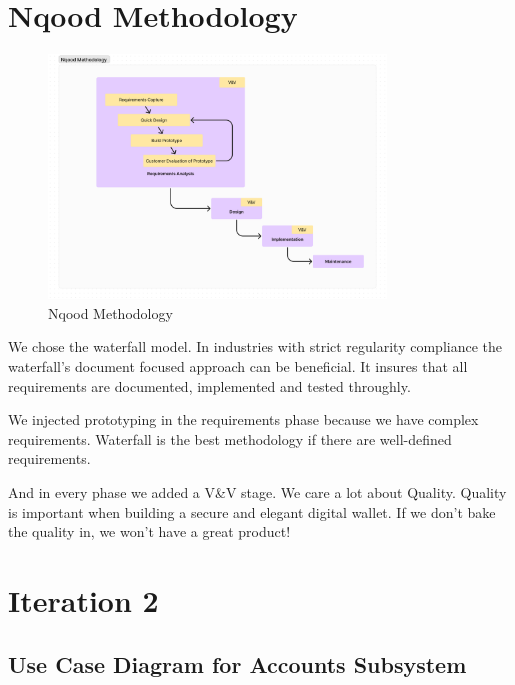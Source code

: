 \documentclass[a4paper]{report}
\begin{document}
\chapter{Nqood Methodology}

\begin{figure}[h!]
    \centering
    \includegraphics[width=0.8\textwidth]{images/nqood-methodology.png}
    \caption{Nqood Methodology}
    \label{fig:nqood-methodology}
\end{figure}

We chose the waterfall model. In industries with strict regularity compliance the waterfall's
document focused approach can be beneficial. It insures that all requirements are documented, implemented and tested
throughly. 

We injected prototyping in the requirements phase because we have complex requirements. Waterfall is the best methodology if there are well-defined requirements.

And in every phase we added a V\&V stage. We care a lot about Quality. Quality is important when building a secure and elegant digital wallet. If we don't bake the quality in, we won't have a great product!

\chapter{Iteration 2}

\section{Use Case Diagram for Accounts Subsystem}
\end{document}

